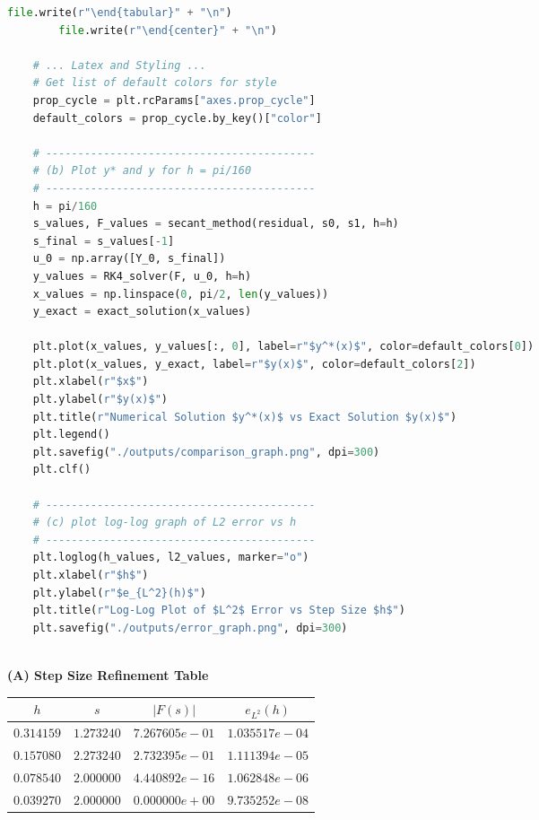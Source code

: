 \documentclass[12pt]{article}
\begin{document}
\begin{lstlisting}[language=Python, caption={Step Size Refinement Study (hw3.py)}]
        file.write(r"\end{tabular}" + "\n")
        file.write(r"\end{center}" + "\n")
    
    # ... Latex and Styling ...
    # Get list of default colors for style
    prop_cycle = plt.rcParams["axes.prop_cycle"]
    default_colors = prop_cycle.by_key()["color"]
    
    # ------------------------------------------
    # (b) Plot y* and y for h = pi/160
    # ------------------------------------------
    h = pi/160
    s_values, F_values = secant_method(residual, s0, s1, h=h)
    s_final = s_values[-1]
    u_0 = np.array([Y_0, s_final])
    y_values = RK4_solver(F, u_0, h=h)
    x_values = np.linspace(0, pi/2, len(y_values))
    y_exact = exact_solution(x_values)
    
    plt.plot(x_values, y_values[:, 0], label=r"$y^*(x)$", color=default_colors[0])
    plt.plot(x_values, y_exact, label=r"$y(x)$", color=default_colors[2])
    plt.xlabel(r"$x$")
    plt.ylabel(r"$y(x)$")
    plt.title(r"Numerical Solution $y^*(x)$ vs Exact Solution $y(x)$")
    plt.legend()
    plt.savefig("./outputs/comparison_graph.png", dpi=300)
    plt.clf() 
    
    # ------------------------------------------
    # (c) plot log-log graph of L2 error vs h
    # ------------------------------------------
    plt.loglog(h_values, l2_values, marker="o")
    plt.xlabel(r"$h$")
    plt.ylabel(r"$e_{L^2}(h)$")
    plt.title(r"Log-Log Plot of $L^2$ Error vs Step Size $h$")
    plt.savefig("./outputs/error_graph.png", dpi=300)
    
\end{lstlisting}

\begin{center}
    \textbf{(A) Step Size Refinement Table}
    \vspace{0.02cm}

    \begin{tabular}{|c|c|c|c|}
    \hline
    $h$ & $s$ & $|F(s)|$ & $e_{L^2}(h)$ \\
    \hline
    $0.314159$ & $1.273240$ & $7.267605e-01$ & $1.035517e-04$ \\
    \hline
    $0.157080$ & $2.273240$ & $2.732395e-01$ & $1.111394e-05$ \\
    \hline
    $0.078540$ & $2.000000$ & $4.440892e-16$ & $1.062848e-06$ \\
    \hline
    $0.039270$ & $2.000000$ & $0.000000e+00$ & $9.735252e-08$ \\
    \hline
    \end{tabular}
\end{center}
\end{document}
